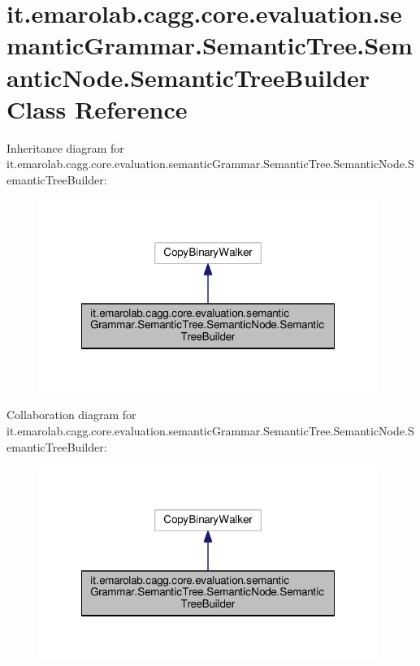 \hypertarget{classit_1_1emarolab_1_1cagg_1_1core_1_1evaluation_1_1semanticGrammar_1_1SemanticTree_1_1SemanticNode_1_1SemanticTreeBuilder}{\section{it.\-emarolab.\-cagg.\-core.\-evaluation.\-semantic\-Grammar.\-Semantic\-Tree.\-Semantic\-Node.\-Semantic\-Tree\-Builder Class Reference}
\label{classit_1_1emarolab_1_1cagg_1_1core_1_1evaluation_1_1semanticGrammar_1_1SemanticTree_1_1SemanticNode_1_1SemanticTreeBuilder}
}


Inheritance diagram for it.\-emarolab.\-cagg.\-core.\-evaluation.\-semantic\-Grammar.\-Semantic\-Tree.\-Semantic\-Node.\-Semantic\-Tree\-Builder\-:\nopagebreak
\begin{figure}[H]
\begin{center}
\leavevmode
\includegraphics[width=312pt]{classit_1_1emarolab_1_1cagg_1_1core_1_1evaluation_1_1semanticGrammar_1_1SemanticTree_1_1Semanticc4bf1c5cc9321904efa7d49487e41284}
\end{center}
\end{figure}


Collaboration diagram for it.\-emarolab.\-cagg.\-core.\-evaluation.\-semantic\-Grammar.\-Semantic\-Tree.\-Semantic\-Node.\-Semantic\-Tree\-Builder\-:\nopagebreak
\begin{figure}[H]
\begin{center}
\leavevmode
\includegraphics[width=312pt]{classit_1_1emarolab_1_1cagg_1_1core_1_1evaluation_1_1semanticGrammar_1_1SemanticTree_1_1Semantic79f2623c2bfe0ce167fae35f6eb011b3}
\end{center}
\end{figure}
